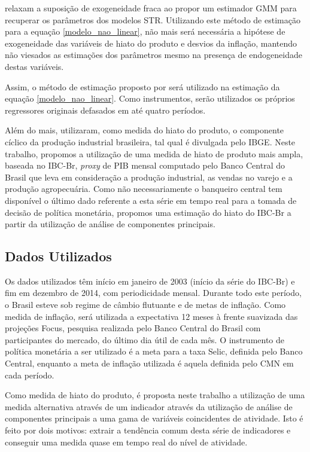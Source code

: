 \documentclass[
	article,			%
	11pt,				%
	oneside,			%
	a4paper,			%
	english,			%
	brazil,				%
	]{abntex2}
\begin{document}
	 relaxam a suposição de exogeneidade fraca ao propor um estimador GMM para recuperar os parâmetros dos modelos STR.	Utilizando este método de estimação para a equação \ref{modelo_nao_linear}, não mais será necessária a hipótese de exogeneidade das variáveis de hiato do produto e desvios da inflação, mantendo não viesados as estimações dos parâmetros mesmo na presença de endogeneidade destas variáveis.
	
	Assim, o método de estimação proposto por  será utilizado na estimação da equação \ref{modelo_nao_linear}. Como instrumentos, serão utilizados os próprios regressores originais defasados em até quatro períodos.
	
	Além do mais,  utilizaram, como medida do hiato do produto, o componente cíclico da produção industrial brasileira, tal qual é divulgada pelo IBGE. Neste trabalho, propomos a utilização de uma medida de hiato de produto mais ampla, baseada no IBC-Br, \textsl{proxy} de PIB mensal computado pelo Banco Central do Brasil que leva em consideração a produção industrial, as vendas no varejo e a produção agropecuária. Como não necessariamente o banqueiro central tem disponível o último dado referente a esta série em tempo real para a tomada de decisão de política monetária, propomos uma estimação do hiato do IBC-Br a partir da utilização de análise de componentes principais.
	
	
	
	\subsection{Dados Utilizados}
	Os dados utilizados têm início em janeiro de 2003 (início da série do IBC-Br) e fim em dezembro de 2014, com periodicidade mensal. Durante todo este período, o Brasil esteve sob regime de câmbio flutuante e de metas de inflação. Como medida de inflação, será utilizada a expectativa 12 meses à frente suavizada das projeções Focus, pesquisa realizada pelo Banco Central do Brasil com participantes do mercado, do último dia útil de cada mês. O instrumento de política monetária a ser utilizado é a meta para a taxa Selic, definida pelo Banco Central, enquanto a meta de inflação utilizada é aquela definida pelo CMN em cada período.
	
	Como medida de hiato do produto, é proposta neste trabalho a utilização de uma medida alternativa através de um indicador através da utilização de análise de componentes principais a uma gama de variáveis coincidentes de atividade. Isto é feito por dois motivos: extrair a tendência comum desta série de indicadores e conseguir uma medida quase em tempo real do nível de atividade.
	
\end{document}
